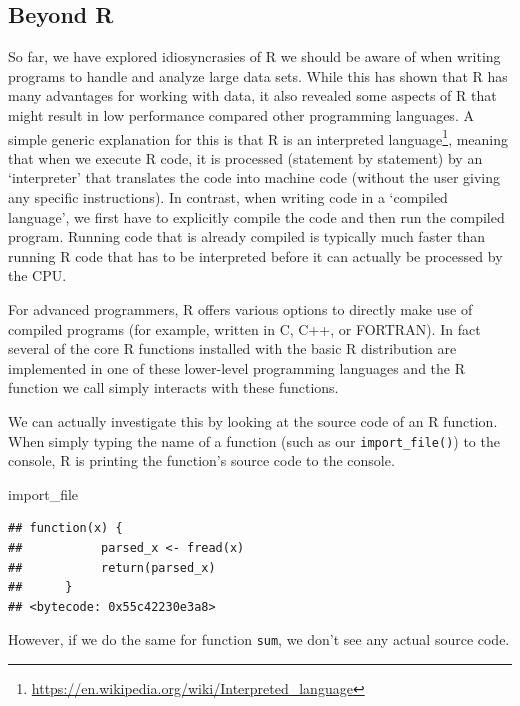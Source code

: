 \documentclass[
  12pt,
]{style/krantz}
\newenvironment{Shaded}{\begin{snugshade}}{\end{snugshade}}
\newcommand{\NormalTok}[1]{#1}
\renewcommand{\href}[2]{#2\footnote{\url{#1}}}
\begin{document}
\hypertarget{beyond-r}{%
\subsection{Beyond R}\label{beyond-r}}

So far, we have explored idiosyncrasies of R we should be aware of when writing programs to handle and analyze large data sets. While this has shown that R has many advantages for working with data, it also revealed some aspects of R that might result in low performance compared other programming languages. A simple generic explanation for this is that R is an \href{https://en.wikipedia.org/wiki/Interpreted_language}{interpreted language}, meaning that when we execute R code, it is processed (statement by statement) by an `interpreter' that translates the code into machine code (without the user giving any specific instructions). In contrast, when writing code in a `compiled language', we first have to explicitly compile the code and then run the compiled program. Running code that is already compiled is typically much faster than running R code that has to be interpreted before it can actually be processed by the CPU.

For advanced programmers, R offers various options to directly make use of compiled programs (for example, written in C, C++, or FORTRAN). In fact several of the core R functions installed with the basic R distribution are implemented in one of these lower-level programming languages and the R function we call simply interacts with these functions.

We can actually investigate this by looking at the source code of an R function. When simply typing the name of a function (such as our \texttt{import\_file()}) to the console, R is printing the function's source code to the console.

\begin{Shaded}
\begin{Highlighting}[]
\NormalTok{import\_file}
\end{Highlighting}
\end{Shaded}

\begin{verbatim}
## function(x) {
##           parsed_x <- fread(x)
##           return(parsed_x)
##      }
## <bytecode: 0x55c42230e3a8>
\end{verbatim}

However, if we do the same for function \texttt{sum}, we don't see any actual source code.
\end{document}
